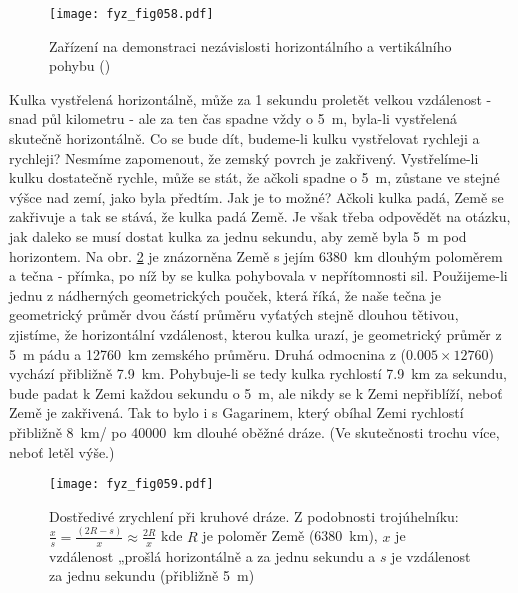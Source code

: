 {    \begin{figure}[ht!]  %
      \centering
      \texttt{[image: fyz\_fig058.pdf]}
      \caption{Zařízení na demonstraci nezávislosti horizontálního a vertikálního pohybu 
               (\cite[s.~96]{Feynman01})}
      \label{fyz:fig058}
    \end{figure}
    Kulka vystřelená horizontálně, může za \num{1} sekundu proletět velkou vzdálenost - snad půl 
    kilometru - ale za ten čas spadne vždy o \SI{5}{\m}, byla-li vystřelená skutečně horizontálně. 
    Co se bude dít, budeme-li kulku vystřelovat rychleji a rychleji? Nesmíme zapomenout, že zemský 
    povrch je zakřivený. Vystřelíme-li kulku dostatečně rychle, může se stát, že ačkoli spadne o 
    \SI{5}{\m}, zůstane ve stejné výšce nad zemí, jako byla předtím. Jak je to možné? Ačkoli kulka 
    padá, Země se zakřivuje a tak se stává, že kulka padá  Země. Je však třeba odpovědět 
    na otázku, jak daleko se musí dostat kulka za jednu sekundu, aby země byla \SI{5}{\m} pod 
    horizontem. Na obr. \ref{fyz:fig059} je znázorněna Země s jejím \SI{6380}{\km} dlouhým 
    poloměrem a tečna - přímka, po níž by se kulka pohybovala v nepřítomnosti sil. Použijeme-li 
    jednu z nádherných geometrických pouček, která říká, že naše tečna je geometrický průměr dvou 
    částí průměru vyťatých stejně dlouhou tětivou, zjistíme, že horizontální vzdálenost, kterou 
    kulka urazí, je geometrický průměr z \SI{5}{\m} pádu a \SI{12760}{\km} zemského průměru. Druhá 
    odmocnina z (\(\num{0.005}\times\num{12760}\)) vychází přibližně \SI{7.9}{\km}. Pohybuje-li se 
    tedy kulka rychlostí \SI{7.9}{\km} za sekundu, bude padat k Zemi každou sekundu o \SI{5}{\m}, 
    ale nikdy se k Zemi nepřiblíží, neboť Země je zakřivená. Tak to bylo i s Gagarinem, který 
    obíhal Zemi rychlostí přibližně \SI{8}{\km/\sec} po \SI{40000}{\km} dlouhé oběžné dráze. (Ve 
    skutečnosti trochu více, neboť letěl výše.)

    \begin{figure}[ht!]  %
      \centering
      \texttt{[image: fyz\_fig059.pdf]}
      \caption{Dostředivé zrychlení při kruhové dráze. Z podobnosti trojúhelníku: \(\frac{x}{s} = 
               \frac{(2R - s)}{x} \approx \frac{2R}{x}\) kde \(R\) je poloměr Země             
               (\SI{6380}{\km}), \(x\) je vzdálenost „prošlá horizontálně a za jednu sekundu a 
               \(s\) je vzdálenost  za jednu sekundu (přibližně \SI{5}{\m}) 
               \cite[s.~97]{Feynman01}}
       \label{fyz:fig059}
    \end{figure}
    
}
